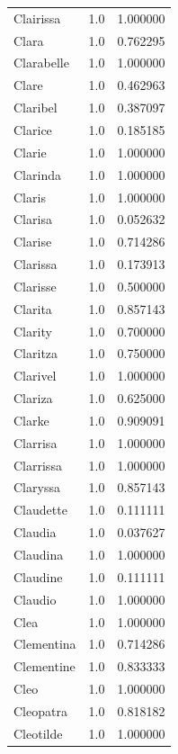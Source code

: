 \documentclass[
  letterpaper,
  DIV=11,
  numbers=noendperiod]{scrreprt}
\begin{document}
\begin{tabular}{lrr}
Clairissa       &   1.0 &   1.000000 \\
Clara           &   1.0 &   0.762295 \\
Clarabelle      &   1.0 &   1.000000 \\
Clare           &   1.0 &   0.462963 \\
Claribel        &   1.0 &   0.387097 \\
Clarice         &   1.0 &   0.185185 \\
Clarie          &   1.0 &   1.000000 \\
Clarinda        &   1.0 &   1.000000 \\
Claris          &   1.0 &   1.000000 \\
Clarisa         &   1.0 &   0.052632 \\
Clarise         &   1.0 &   0.714286 \\
Clarissa        &   1.0 &   0.173913 \\
Clarisse        &   1.0 &   0.500000 \\
Clarita         &   1.0 &   0.857143 \\
Clarity         &   1.0 &   0.700000 \\
Claritza        &   1.0 &   0.750000 \\
Clarivel        &   1.0 &   1.000000 \\
Clariza         &   1.0 &   0.625000 \\
Clarke          &   1.0 &   0.909091 \\
Clarrisa        &   1.0 &   1.000000 \\
Clarrissa       &   1.0 &   1.000000 \\
Claryssa        &   1.0 &   0.857143 \\
Claudette       &   1.0 &   0.111111 \\
Claudia         &   1.0 &   0.037627 \\
Claudina        &   1.0 &   1.000000 \\
Claudine        &   1.0 &   0.111111 \\
Claudio         &   1.0 &   1.000000 \\
Clea            &   1.0 &   1.000000 \\
Clementina      &   1.0 &   0.714286 \\
Clementine      &   1.0 &   0.833333 \\
Cleo            &   1.0 &   1.000000 \\
Cleopatra       &   1.0 &   0.818182 \\
Cleotilde       &   1.0 &   1.000000 \\

\end{tabular}
\end{document}
